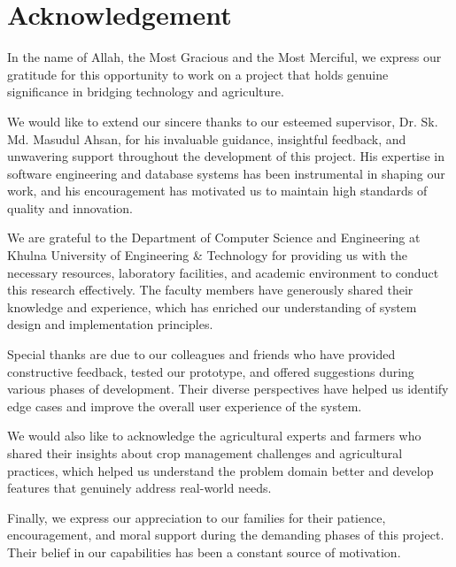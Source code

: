 \documentclass[12pt,a4paper]{report}
\begin{document}
\newpage

\chapter*{Acknowledgement}

In the name of Allah, the Most Gracious and the Most Merciful, we express our gratitude for this opportunity to work on a project that holds genuine significance in bridging technology and agriculture. 

We would like to extend our sincere thanks to our esteemed supervisor, Dr. Sk. Md. Masudul Ahsan, for his invaluable guidance, insightful feedback, and unwavering support throughout the development of this project. His expertise in software engineering and database systems has been instrumental in shaping our work, and his encouragement has motivated us to maintain high standards of quality and innovation.

We are grateful to the Department of Computer Science and Engineering at Khulna University of Engineering \& Technology for providing us with the necessary resources, laboratory facilities, and academic environment to conduct this research effectively. The faculty members have generously shared their knowledge and experience, which has enriched our understanding of system design and implementation principles.

Special thanks are due to our colleagues and friends who have provided constructive feedback, tested our prototype, and offered suggestions during various phases of development. Their diverse perspectives have helped us identify edge cases and improve the overall user experience of the system.

We would also like to acknowledge the agricultural experts and farmers who shared their insights about crop management challenges and agricultural practices, which helped us understand the problem domain better and develop features that genuinely address real-world needs.

Finally, we express our appreciation to our families for their patience, encouragement, and moral support during the demanding phases of this project. Their belief in our capabilities has been a constant source of motivation.

\newpage
\end{document}
